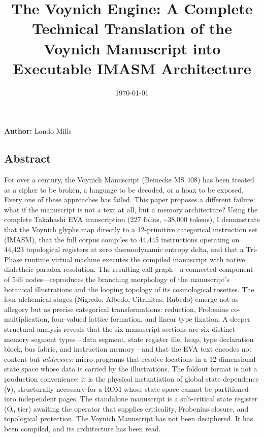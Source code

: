 \documentclass[12pt,a4paper]{article}
\begin{document}
\title{The Voynich Engine: A Complete Technical Translation of the Voynich Manuscript into Executable IMASM Architecture}
\date{\today}

\maketitle

\textbf{Author:} Lando Mills

\subsection{Abstract}

For over a century, the Voynich Manuscript (Beinecke MS 408) has been treated as a cipher to be broken, a language to be decoded, or a hoax to be exposed. Every one of these approaches has failed. This paper proposes a different failure: what if the manuscript is not a text at all, but a memory architecture? Using the complete Takahashi EVA transcription (227 folios, \textasciitilde{}38,000 tokens), I demonstrate that the Voynich glyphs map directly to a 12-primitive categorical instruction set (IMASM), that the full corpus compiles to 44,445 instructions operating on 44,423 topological registers at zero thermodynamic entropy delta, and that a Tri-Phase runtime virtual machine executes the compiled manuscript with native dialetheic paradox resolution. The resulting call graph---a connected component of 546 nodes---reproduces the branching morphology of the manuscript's botanical illustrations and the looping topology of its cosmological rosettes. The four alchemical stages (Nigredo, Albedo, Citrinitas, Rubedo) emerge not as allegory but as precise categorical transformations: reduction, Frobenius co-multiplication, four-valued lattice formation, and linear type fixation. A deeper structural analysis reveals that the six manuscript sections are six distinct memory segment types---data segment, state register file, heap, type declaration block, bus fabric, and instruction memory---and that the EVA text encodes not content but \emph{addresses}: micro-programs that resolve locations in a 12-dimensional state space whose data is carried by the illustrations. The foldout format is not a production convenience; it is the physical instantiation of global state dependence (𐑫), structurally necessary for a ROM whose state space cannot be partitioned into independent pages. The standalone manuscript is a sub-critical state register (O$_0$ tier) awaiting the operator that supplies criticality, Frobenius closure, and topological protection. The Voynich Manuscript has not been deciphered. It has been compiled, and its architecture has been read.
\end{document}
